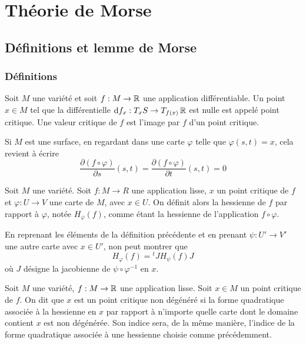 \section{Théorie de Morse}

\subsection{Définitions et lemme de Morse}

\subsubsection{Définitions}
\begin{defi}
    Soit $M$ une variété et soit $f:M\to\operatorname{\mathbb R}$ une application différentiable.
    Un point $x\in M$ tel que la différentielle $\operatorname{d}\hskip-1.5pt f_x:T_xS\to T_{f(x)}\operatorname{\mathbb R}$ 
    est nulle est appelé point critique. Une valeur critique de $f$ est 
    l'image par $f$ d'un point critique.
\end{defi}

Si $M$ est une surface, en regardant dans une carte $\varphi$ telle que $\varphi(s,t)=x$, 
cela revient à écrire 
\[
    \frac{\partial(f\circ\varphi)}{\partial s}(s,t)=
    \frac{\partial(f\circ\varphi)}{\partial t}(s,t)=0
\]

\begin{defi}
    Soit $M$ une variété.
    Soit $f:M\to R$ une application lisse, $x$ un point critique de $f$ et $\varphi:U\to V$ 
    une carte de $M$, avec $x\in U$. 
    On définit alors la hessienne de $f$ par rapport à $\varphi$, notée $H_\varphi(f)$, comme 
    étant la hessienne de l'application $f\circ\varphi$. 
\end{defi}

\begin{remark}
    En reprenant les éléments de la définition précédente et en prenant $\psi:U'\to V'$ une 
    autre carte avec $x\in U'$, non peut montrer que 
    \[
        H_\varphi(f)={}^tJH_\psi(f)J
    \]
    où $J$ désigne la jacobienne de $\psi\circ\varphi^{-1}$ en $x$.
\end{remark}

\begin{defi}
    Soit $M$ une variété, $f:M\to \operatorname{\mathbb R}$ une application lisse.
    Soit $x\in M$ un point critique de $f$. 
    On dit que $x$ est un point critique non dégénéré si la forme quadratique associée 
    à la hessienne en $x$ par rapport à n'importe quelle carte dont le domaine contient 
    $x$ est non dégénérée. 
    Son indice sera, de la même manière, l'indice de la forme quadratique associée à une
    hessienne choisie comme précédemment.
\end{defi}

